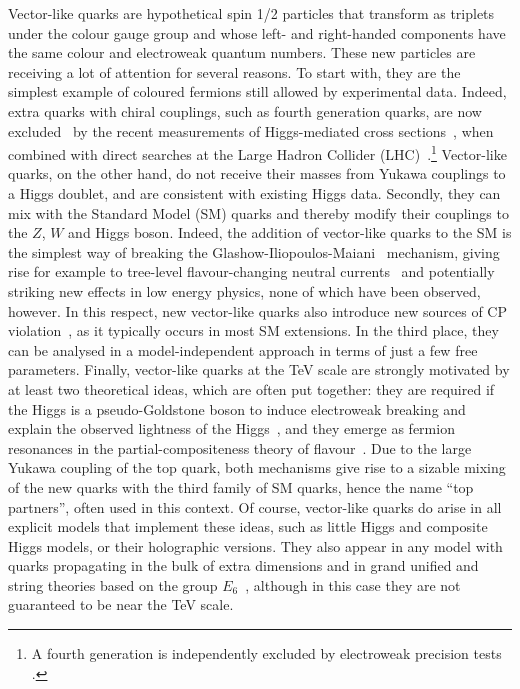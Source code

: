 \documentclass[12pt,a4paper]{article}
\begin{document}
Vector-like quarks are hypothetical spin 1/2 particles that transform as triplets under the colour gauge group and whose left- and right-handed components have the same colour and electroweak quantum numbers. These new particles are receiving a lot of attention for several reasons. To start with, they are the simplest example of coloured fermions still allowed by experimental data. Indeed, extra quarks with chiral couplings, such as fourth generation quarks, are now excluded~\cite{Djouadi:2012ae} by the recent measurements of Higgs-mediated cross sections~\cite{ATLAS:2013sla,CMS:yva}, when combined with direct searches at the Large Hadron Collider (LHC)~\cite{ATLAS:2012qe,Chatrchyan:2012vu}.\footnote{A fourth generation is independently excluded by electroweak precision tests \cite{Eberhardt:2012gv}.} Vector-like quarks, on the other hand, do not receive their masses from Yukawa couplings to a Higgs doublet, and are consistent with existing Higgs data. Secondly, they can mix with the Standard Model (SM) quarks and thereby modify their couplings to the $Z$, $W$ and Higgs boson. Indeed, the addition of vector-like quarks to the SM is the simplest way of breaking the Glashow-Iliopoulos-Maiani~\cite{Glashow:1970gm} mechanism, giving rise for example to tree-level flavour-changing neutral currents~\cite{delAguila:1982fs,Branco:1986my} and potentially striking new effects in low energy physics, none of which have been observed, however.
In this respect, new vector-like quarks also introduce new sources of CP violation~\cite{Nir:1990yq,Branco:1992wr,delAguila:1997vn,Barenboim:1997qx}, as it typically occurs in most SM extensions. In the third place, they can be analysed in a model-independent approach in terms of just a few free parameters. Finally, vector-like quarks at the TeV scale are strongly motivated by at least two theoretical ideas, which are often put together: they are required if the Higgs is a pseudo-Goldstone boson to induce electroweak breaking and explain the observed lightness of the Higgs~\cite{Perelstein:2003wd,Contino:2006qr,Matsedonskyi:2012ym}, and they emerge as fermion resonances in the partial-compositeness theory of flavour~\cite{Kaplan:1991dc,Contino:2006nn}.  Due to the large Yukawa coupling of the top quark, both mechanisms give rise to a sizable mixing of the new quarks with the third family of SM quarks, hence the name ``top partners'', often used in this context. Of course, vector-like quarks do arise in all explicit models that implement these ideas, such as little Higgs and composite Higgs models, or their holographic versions. They also appear in any model with quarks propagating in the bulk of extra dimensions and in grand unified and string theories based on the group $E_6$~\cite{Hewett:1988xc}, although in this case they are not guaranteed to be near the TeV scale.
\end{document}
